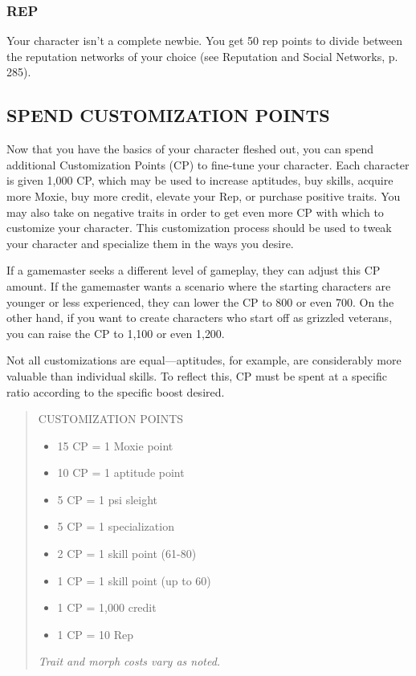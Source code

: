 \subsubsection{REP}
Your character isn’t a complete newbie. You get 50 rep points to divide between
the reputation networks of your choice (see Reputation and Social Networks,
p. 285).

\subsection{SPEND CUSTOMIZATION POINTS} 
Now that you have the basics of your character fleshed out, you can spend
additional Customization Points (CP) to fine-tune your character. Each
character is given 1,000 CP, which may be used to increase aptitudes, buy
skills, acquire more Moxie, buy more credit, elevate your Rep, or purchase
positive traits. You may also take on negative traits in order to get even
more CP with which to customize your character. This customization process
should be used to tweak your character and specialize them in the ways you
desire.

If a gamemaster seeks a different level of gameplay, they can adjust this CP
amount. If the gamemaster wants a scenario where the starting characters are
younger or less experienced, they can lower the CP to 800 or even 700. On the
other hand, if you want to create characters who start off as grizzled
veterans, you can raise the CP to 1,100 or even 1,200.

Not all customizations are equal—aptitudes, for example, are considerably
more valuable than individual skills. To reflect this, CP must be spent at a
specific ratio according to the specific boost desired.

\begin{quotation}
  CUSTOMIZATION POINTS
  \begin{itemize}
  \item 15 CP = 1 Moxie point
  \item 10 CP = 1 aptitude point
  \item 5 CP = 1 psi sleight
  \item 5 CP = 1 specialization
  \item 2 CP = 1 skill point (61-80)
  \item 1 CP = 1 skill point (up to 60)
  \item 1 CP = 1,000 credit
  \item 1 CP = 10 Rep
\end{itemize}
\textit{Trait and morph costs vary as noted.}
\end{quotation}


